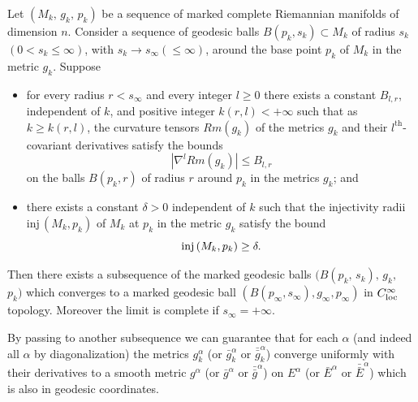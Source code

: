 \begin{theorem}
  \label{thm:cz-cheeger-type-pointed-compactness}
Let\; $(M_k,\,g_k,\,p_k)$\; be\; a\; sequence\; of marked complete
Riemannian manifolds of dimension $n$. Consider a sequence of
geodesic balls $B(p_k,s_k) \subset M_k$ of radius $s_k$ $(0<s_k\le
\infty)$, with $s_k \rightarrow s_{\infty}(\le \infty)$, around
the base point $p_k$ of $M_k$ in the metric $g_k$. Suppose
\begin{itemize}
\item[(a)] for every radius $r<s_{\infty}$ and every integer $l\ge
0$ there exists a constant $B_{l,r}$, independent of $k$, and
positive integer $k(r,l) < +\infty$ such that as $k \geq k(r,l)$,
the curvature tensors $Rm(g_k)$ of the metrics $g_k$ and their
$l^{\mbox{th}}$-covariant derivatives satisfy the bounds
$$
|\nabla^lRm(g_k)|\leq B_{l,r}
$$
on the balls $B(p_k, r)$ of radius $r$ around $p_k$ in the metrics
$g_k$; and \item[(b)] there exists a constant $\delta>0$
independent of $k$ such that the injectivity radii
inj$\,(M_k,p_k)$ of $M_k$ at $p_k$ in the metric $g_k$ satisfy the
bound
$$
{\rm inj}\,(M_k,p_k)\geq\delta.$$
\end{itemize}
Then there exists a subsequence of the marked geodesic balls
$(B(p_k,\,s_k),\,g_k,$ $p_k)$ which converges to a marked geodesic
ball $(B(p_{\infty},s_{\infty}),g_{\infty},p_{\infty})$ in
$C^\infty_{\rm loc}$ topology. Moreover the limit is complete if
$s_{\infty} = +\infty$.

\end{theorem}
\begin{proposition}
  \label{prop:cz-local-metric-subsequence-convergence}
By passing to another subsequence we
can guarantee that for each $\alpha$ (and indeed all $\alpha$ by
diagonalization) the metrics $g_k^{\alpha}$ (or $\bar
g_k^{\alpha}$ or ${\bar{\bar g}}_k^{\alpha}$) converge uniformly
with their derivatives to a smooth metric $g^{\alpha}$ (or $\bar
g^{\alpha}$ or ${\bar{\bar g}}^{\alpha}$) on $E^{\alpha}$ (or
$\bar E^{\alpha}$ or ${\bar{\bar E}}^{\alpha}$) which is also in
geodesic coordinates.
\end{proposition}
